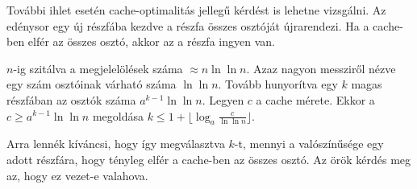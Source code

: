 \documentclass{article}
\begin{document}
További ihlet esetén cache-optimalitás jellegű kérdést is lehetne vizsgálni. Az edénysor egy új részfába kezdve a részfa összes osztóját újrarendezi. Ha a cache-ben elfér az összes osztó, akkor az a részfa ingyen van.

$n$-ig szitálva a megjelelölések száma $\approx n \ln{\ln{n}}$. Azaz nagyon messziről nézve egy szám osztóinak  várható száma $\ln{\ln{n}}$. Tovább hunyorítva egy $k$ magas részfában az osztók száma $a^{k-1} \ln{\ln{n}}$. Legyen $c$ a cache mérete. Ekkor a $c \ge a^{k-1} \ln{\ln{n}}$ megoldása $k \le 1 + \lfloor \log_{a}{\frac{c}{\ln{\ln{n}}}} \rfloor$.

Arra lennék kíváncsi, hogy így megválasztva $k$-t, mennyi a valószínűsége egy adott részfára, hogy tényleg elfér a cache-ben az összes osztó. Az örök kérdés meg az, hogy ez vezet-e valahova.
\end{document}
